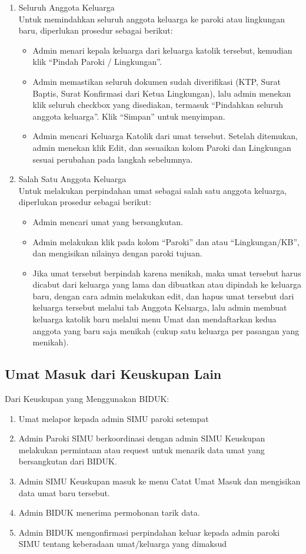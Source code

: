 \begin{enumerate}
	\item Seluruh Anggota Keluarga \\
	Untuk memindahkan seluruh anggota keluarga ke paroki atau lingkungan baru, diperlukan prosedur sebagai berikut:
	\begin{itemize}
		\item Admin menari kepala keluarga dari keluarga katolik tersebut, kemudian klik “Pindah Paroki / Lingkungan”.
		\item Admin memastikan seluruh dokumen sudah diverifikasi (KTP, Surat Baptis, Surat Konfirmasi dari Ketua Lingkungan), lalu admin menekan klik seluruh checkbox yang disediakan, termasuk “Pindahkan seluruh anggota keluarga”. Klik “Simpan” untuk menyimpan.
		\item Admin mencari Keluarga Katolik dari umat tersebut. Setelah ditemukan, admin menekan klik Edit, dan sesuaikan kolom Paroki dan Lingkungan sesuai perubahan pada langkah sebelumnya.
	\end{itemize}
	\item Salah Satu Anggota Keluarga \\
	Untuk melakukan perpindahan umat sebagai salah satu anggota keluarga, diperlukan prosedur sebagai berikut:
	\begin{itemize}
		\item Admin mencari umat yang bersangkutan.
		\item Admin melakukan klik pada kolom “Paroki” dan atau “Lingkungan/KB”, dan mengisikan nilainya dengan paroki tujuan.
		\item Jika umat tersebut berpindah karena menikah, maka umat tersebut harus dicabut dari keluarga yang lama dan dibuatkan atau dipindah ke keluarga baru, dengan cara admin melakukan edit, dan hapus umat tersebut dari keluarga tersebut melalui tab Anggota Keluarga, lalu admin membuat keluarga katolik baru melalui menu Umat dan mendaftarkan kedua anggota yang baru saja menikah (cukup satu keluarga per pasangan yang menikah).
	\end{itemize}
\end{enumerate}

\subsection{Umat Masuk dari Keuskupan Lain}
\label{sec:umatMasuk}
Dari Keuskupan yang Menggunakan BIDUK:
\begin{enumerate}
	\item Umat melapor kepada admin SIMU paroki setempat
	\item Admin Paroki SIMU berkoordinasi dengan admin SIMU Keuskupan melakukan permintaan atau request untuk menarik data umat yang bersangkutan dari BIDUK.
	\item Admin SIMU Keuskupan masuk ke menu Catat Umat Masuk dan mengisikan data umat baru tersebut.
	\item Admin BIDUK menerima permohonan tarik data.
	\item Admin BIDUK mengonfirmasi perpindahan keluar kepada admin paroki SIMU tentang keberadaan umat/keluarga yang dimaksud
\end{enumerate}

